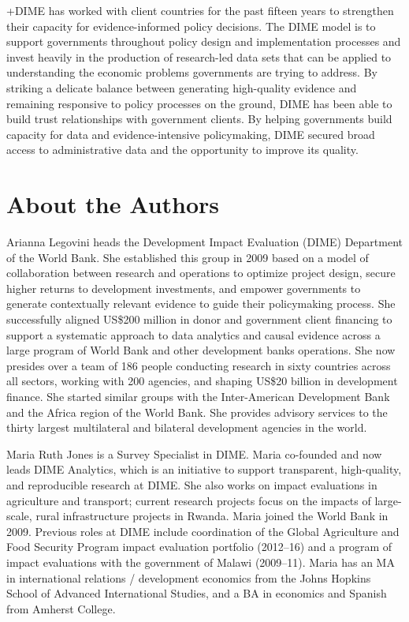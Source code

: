 \documentclass[
]{book}
\begin{document}
+DIME\textbar{} has worked with client countries for the past fifteen years to strengthen their capacity for evidence-informed policy decisions. The DIME model is to support governments throughout policy design and implementation processes and invest heavily in the production of research-led data sets that can be applied to understanding the economic problems governments are trying to address. By striking a delicate balance between generating high-quality evidence and remaining responsive to policy processes on the ground, DIME has been able to build trust relationships with government clients. By helping governments build capacity for data and evidence-intensive policymaking, DIME secured broad access to administrative data and the opportunity to improve its quality.

\hypertarget{about-the-authors-7}{%
\section*{About the Authors}\label{about-the-authors-7}}

Arianna Legovini heads the Development Impact Evaluation (DIME) Department of the World Bank. She established this group in 2009 based on a model of collaboration between research and operations to optimize project design, secure higher returns to development investments, and empower governments to generate contextually relevant evidence to guide their policymaking process. She successfully aligned US\$200 million in donor and government client financing to support a systematic approach to data analytics and causal evidence across a large program of World Bank and other development banks operations. She now presides over a team of 186 people conducting research in sixty countries across all sectors, working with 200 agencies, and shaping US\$20 billion in development finance. She started similar groups with the Inter-American Development Bank and the Africa region of the World Bank. She provides advisory services to the thirty largest multilateral and bilateral development agencies in the world.

Maria Ruth Jones is a Survey Specialist in DIME. Maria co-founded and now leads DIME Analytics, which is an initiative to support transparent, high-quality, and reproducible research at DIME. She also works on impact evaluations in agriculture and transport; current research projects focus on the impacts of large-scale, rural infrastructure projects in Rwanda. Maria joined the World Bank in 2009. Previous roles at DIME include coordination of the Global Agriculture and Food Security Program impact evaluation portfolio (2012--16) and a program of impact evaluations with the government of Malawi (2009--11). Maria has an MA in international relations / development economics from the Johns Hopkins School of Advanced International Studies, and a BA in economics and Spanish from Amherst College.
\end{document}
